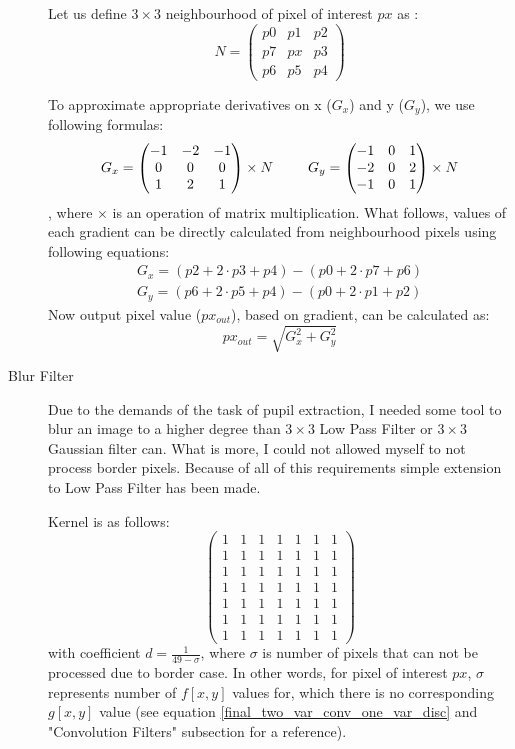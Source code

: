 \documentclass{article}
\begin{document}
\begin{description}
Let us define $3 \times 3$ neighbourhood of pixel of interest $px$ as :
\[
N = 
\begin{pmatrix}
  p0 & p1 & p2 \\
  p7 & px & p3 \\
  p6 & p5 & p4
\end{pmatrix}
\]

To approximate appropriate derivatives on x ($G_x$) and y ($G_y$), we use following formulas:
\[
G_x =
\begin{pmatrix}
  -1 & -2 & -1 \\
   0 & 0 & 0 \\
   1 & 2 & 1
\end{pmatrix}
\times
N
\hskip 2.5em
G_y =
\begin{pmatrix}
  -1 & 0 & 1 \\
   -2 & 0 & 2 \\
   -1 & 0 & 1
\end{pmatrix}
\times
N
\]
, where $\times$ is an operation of matrix multiplication. What follows, values of each gradient can be directly calculated from neighbourhood pixels using following equations:
\[
\begin{split}
G_x = (p2 + 2 \cdot p3 + p4) - (p0 + 2 \cdot p7 + p6) \\
G_y = (p6 + 2 \cdot p5 + p4) - (p0 + 2 \cdot p1 + p2)
\end{split}
\]
Now output pixel value ($px_{out}$), based on gradient, can be calculated as:
\[
px_{out} = \sqrt{G_x^2 + G_y^2}
\]

\pagebreak

\item[Blur Filter]
Due to the demands of the task of pupil extraction, I needed some tool to blur an image to a higher degree than $3 \times 3$ Low Pass Filter or $3 \times 3$ Gaussian filter can. What is more, I could not allowed myself to not process border pixels. Because of all of this requirements simple extension to Low Pass Filter has been made.

Kernel is as follows:
\[
\begin{pmatrix}
  1 & 1 & 1 & 1 & 1 & 1 &1 \\
  1 & 1 & 1 & 1 & 1 & 1 &1 \\
  1 & 1 & 1 & 1 & 1 & 1 &1 \\
  1 & 1 & 1 & 1 & 1 & 1 &1 \\
  1 & 1 & 1 & 1 & 1 & 1 &1 \\
  1 & 1 & 1 & 1 & 1 & 1 &1 \\
  1 & 1 & 1 & 1 & 1 & 1 &1 
 \end{pmatrix}
 \]
with coefficient $d = \frac{1}{49 - \sigma}$, where $\sigma$ is number of pixels that can not be processed due to border case. In other words, for pixel of interest $px$, $\sigma$ represents number of $f[x,y]$ values for, which there is no corresponding $g[x,y]$ value (see equation \ref{final_two_var_conv_one_var_disc} and "Convolution Filters" subsection for a reference). 


\end{description}
\end{document}
